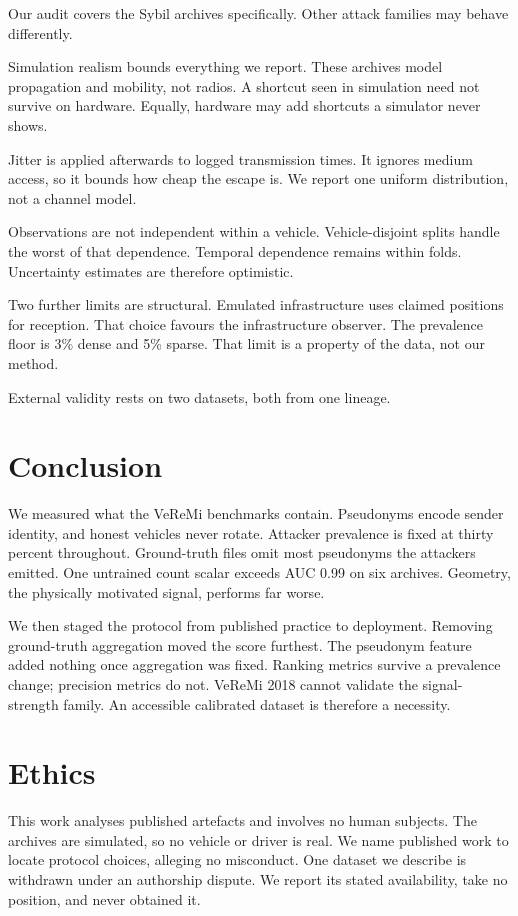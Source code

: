 \documentclass[journal,twoside]{IEEEtran}
\begin{document}
Our audit covers the Sybil archives specifically.
Other attack families may behave differently.

Simulation realism bounds everything we report.
These archives model propagation and mobility, not radios.
A shortcut seen in simulation need not survive on hardware.
Equally, hardware may add shortcuts a simulator never shows.

Jitter is applied afterwards to logged transmission times.
It ignores medium access, so it bounds how cheap the escape is.
We report one uniform distribution, not a channel model.

Observations are not independent within a vehicle.
Vehicle-disjoint splits handle the worst of that dependence.
Temporal dependence remains within folds.
Uncertainty estimates are therefore optimistic.

Two further limits are structural.
Emulated infrastructure uses claimed positions for reception.
That choice favours the infrastructure observer.
The prevalence floor is 3\% dense and 5\% sparse.
That limit is a property of the data, not our method.

External validity rests on two datasets, both from one lineage.

\section{Conclusion}

We measured what the VeReMi benchmarks contain.
Pseudonyms encode sender identity, and honest vehicles never rotate.
Attacker prevalence is fixed at thirty percent throughout.
Ground-truth files omit most pseudonyms the attackers emitted.
One untrained count scalar exceeds AUC 0.99 on six archives.
Geometry, the physically motivated signal, performs far worse.

We then staged the protocol from published practice to deployment.
Removing ground-truth aggregation moved the score furthest.
The pseudonym feature added nothing once aggregation was fixed.
Ranking metrics survive a prevalence change; precision metrics do not.
VeReMi 2018 cannot validate the signal-strength family.
An accessible calibrated dataset is therefore a necessity.

\section*{Ethics}

This work analyses published artefacts and involves no human subjects.
The archives are simulated, so no vehicle or driver is real.
We name published work to locate protocol choices, alleging no misconduct.
One dataset we describe is withdrawn under an authorship dispute.
We report its stated availability, take no position, and never obtained it.
\end{document}
